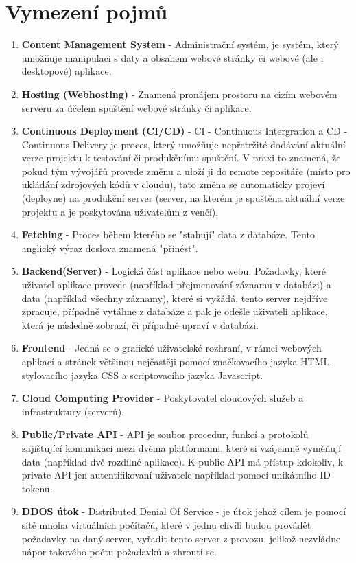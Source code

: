\documentclass[12pt,a4paper]{report}
\begin{document}
  \chapter{Vymezení pojmů}
  \begin{enumerate}
    \item \textbf{Content Management System} - Administrační systém, je systém, který umožňuje manipulaci s daty a obsahem webové stránky či webové (ale i desktopové) aplikace. 
    \item \textbf{Hosting (Webhosting)} - Znamená pronájem prostoru na cizím webovém serveru za účelem spuštění webové stránky či aplikace. 
    \item \textbf{Continuous Deployment (CI/CD)} - CI - Continuous Intergration a CD - Continuous Delivery je proces, který umožňuje nepřetržité dodávání aktuální verze projektu k testování či produkčnímu spuštění. V praxi to znamená, že pokud tým vývojářů provede změnu a uloží ji do remote repositáře (místo pro ukládání zdrojových kódů v cloudu), tato změna se automaticky projeví (deployne) na produkční server (server, na kterém je spuštěna aktuální verze projektu a je poskytována uživatelům z venčí).
    \item \textbf{Fetching} - Proces během kterého se "stahují" data z databáze. Tento anglický výraz doslova znamená "přinést".
    \item \textbf{Backend(Server)} -  Logická část aplikace nebo webu. Požadavky, které uživatel aplikace provede (například přejmenování záznamu v databázi) a data (například všechny záznamy), které si vyžádá, tento server nejdříve zpracuje, případně vytáhne z databáze a pak je odešle uživateli aplikace, která je následně zobrazí, či případně upraví v databázi.
    \item \textbf{Frontend} - Jedná se o grafické uživatelské rozhraní, v rámci webových aplikací a stránek většinou nejčastěji pomocí značkovacího jazyka HTML, stylovacího jazyka CSS a scriptovacího jazyka Javascript.
    \item \textbf{Cloud Computing Provider} - Poskytovatel cloudových služeb a infrastruktury (serverů).
    \item \textbf{Public/Private API} - API je soubor procedur, funkcí a protokolů zajišťující komunikaci mezi dvěma platformami, které si vzájemně vyměňují data (například dvě rozdílné aplikace). K public API má přístup kdokoliv, k private API jen autentifikovaní uživatele například pomocí unikátního ID tokenu.
    \item \textbf{DDOS útok} - Distributed Denial Of Service - je útok jehož cílem je pomocí sítě mnoha virtuálních počítačů, které v jednu chvíli budou provádět požadavky na daný server, vyřadit tento server z provozu, jelikož nezvládne nápor takového počtu požadavků a zhroutí se.

\end{enumerate}
\end{document}
